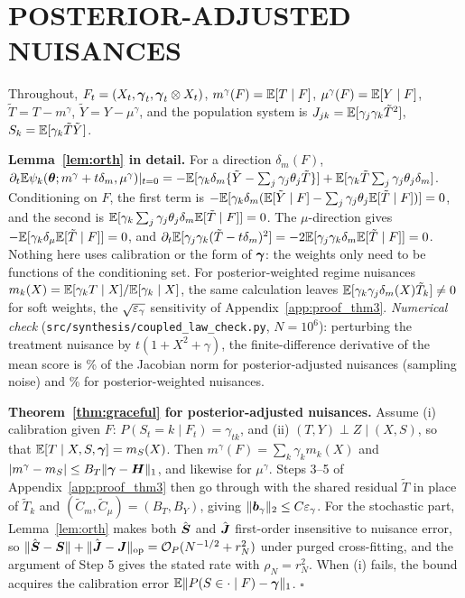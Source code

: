 \section{POSTERIOR-ADJUSTED NUISANCES}
\label{app:pa}
Throughout, $F_t=(X_t,\boldsymbol{\gamma}_t,\boldsymbol{\gamma}_t\otimes X_t)$, $m^\gamma(F)=\mathbb{E}[T\mid F]$, $\mu^\gamma(F)=\mathbb{E}[Y\mid F]$, $\tilde T=T-m^\gamma$, $\tilde Y=Y-\mu^\gamma$, and the population system is $J_{jk}=\mathbb{E}[\gamma_j\gamma_k\tilde T^2]$, $S_k=\mathbb{E}[\gamma_k\tilde T\tilde Y]$.

\textbf{Lemma~\ref{lem:orth} in detail.} For a direction $\delta_m(F)$, $\partial_t\mathbb{E}\psi_k(\boldsymbol{\theta};m^\gamma+t\delta_m,\mu^\gamma)|_{t=0}=-\mathbb{E}[\gamma_k\delta_m\{\tilde Y-\textstyle\sum_j\gamma_j\theta_j\tilde T\}]+\mathbb{E}[\gamma_k\tilde T\textstyle\sum_j\gamma_j\theta_j\delta_m]$. Conditioning on $F$, the first term is $-\mathbb{E}[\gamma_k\delta_m(\mathbb{E}[\tilde Y\mid F]-\sum_j\gamma_j\theta_j\mathbb{E}[\tilde T\mid F])]=0$, and the second is $\mathbb{E}[\gamma_k\sum_j\gamma_j\theta_j\delta_m\mathbb{E}[\tilde T\mid F]]=0$. The $\mu$-direction gives $-\mathbb{E}[\gamma_k\delta_\mu\mathbb{E}[\tilde T\mid F]]=0$, and $\partial_t\mathbb{E}[\gamma_j\gamma_k(\tilde T-t\delta_m)^2]=-2\mathbb{E}[\gamma_j\gamma_k\delta_m\mathbb{E}[\tilde T\mid F]]=0$. Nothing here uses calibration or the form of $\boldsymbol{\gamma}$: the weights only need to be functions of the conditioning set. For posterior-weighted regime nuisances $m_k(X)=\mathbb{E}[\gamma_kT\mid X]/\mathbb{E}[\gamma_k\mid X]$, the same calculation leaves $\mathbb{E}[\gamma_k\gamma_j\delta_m(X)\tilde T_k]\neq0$ for soft weights, the $\sqrt{\varepsilon_\gamma}$ sensitivity of Appendix~\ref{app:proof_thm3}.
\emph{Numerical check} (\texttt{src/synthesis/coupled\_law\_check.py}, $N=10^6$): perturbing the treatment nuisance by $t(1+X^2+\gamma)$, the finite-difference derivative of the mean score is \OrthPA\% of the Jacobian norm for posterior-adjusted nuisances (sampling noise) and \OrthW\% for posterior-weighted nuisances.

\textbf{Theorem~\ref{thm:graceful} for posterior-adjusted nuisances.} Assume (i) calibration given $F$: $P(S_t{=}k\mid F_t)=\gamma_{tk}$, and (ii) $(T,Y)\perp Z\mid(X,S)$, so that $\mathbb{E}[T\mid X,S,\boldsymbol{\gamma}]=m_S(X)$. Then $m^\gamma(F)=\sum_k\gamma_km_k(X)$ and $|m^\gamma-m_S|\le B_T\|\boldsymbol{\gamma}-\boldsymbol H\|_1$, and likewise for $\mu^\gamma$. Steps 3--5 of Appendix~\ref{app:proof_thm3} then go through with the shared residual $\tilde T$ in place of $\tilde T_k$ and $(\tilde C_m,\tilde C_\mu)=(B_T,B_Y)$, giving $\|\boldsymbol b_\gamma\|_2\le C\varepsilon_\gamma$. For the stochastic part, Lemma~\ref{lem:orth} makes both $\hat{\boldsymbol{S}}$ and $\hat{\boldsymbol{J}}$ first-order insensitive to nuisance error, so $\|\hat{\boldsymbol{S}}-\boldsymbol{S}\|+\|\hat{\boldsymbol{J}}-\boldsymbol{J}\|_{\rm op}=\mathcal O_P(N^{-1/2}+r_N^2)$ under purged cross-fitting, and the argument of Step 5 gives the stated rate with $\rho_N=r_N^2$. When (i) fails, the bound acquires the calibration error $\mathbb{E}\|P(S\in\cdot\mid F)-\boldsymbol{\gamma}\|_1$. $\square$

